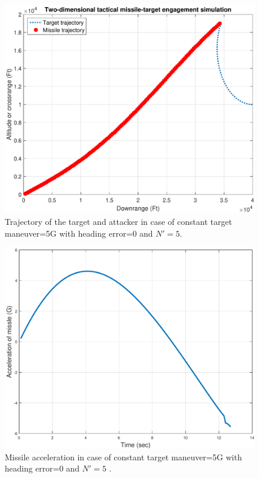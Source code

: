 
\begin{figure}[htb]
	\centering
	\includegraphics[scale = 0.35]{fig/trajectoryXNT5HE0N5.pdf}
	\caption{Trajectory of the target and attacker in case of constant target maneuver=5G with heading error=0 and $N'=5$.}
	\label{trajectory0NN5}
\end{figure}


\begin{figure}[htb]
	\centering
	\includegraphics[scale = 0.35]{fig/MissileAccelerationXNT5HE0N5.pdf}
	\caption{Missile acceleration in case of constant target maneuver=5G with heading error=0 and $N'=5$ .}
	\label{missile acceleration0NN5}
\end{figure}



